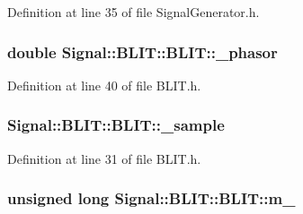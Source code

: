 Definition at line 35 of file Signal\+Generator.\+h.

\hypertarget{classSignal_1_1BLIT_1_1BLIT_ae1ed1e1125cef25e6a0dfb8de3c296da}{
\subsubsection[{\+\_\+phasor}]{\setlength{\rightskip}{0pt plus 5cm}double Signal\+::\+B\+L\+I\+T\+::\+B\+L\+I\+T\+::\+\_\+phasor\hspace{0.3cm}{\ttfamily [protected]}}}\label{classSignal_1_1BLIT_1_1BLIT_ae1ed1e1125cef25e6a0dfb8de3c296da}


Definition at line 40 of file B\+L\+I\+T.\+h.

\hypertarget{classSignal_1_1BLIT_1_1BLIT_ae3db6ee922897295fdf93a3b3c3dfadd}{
\subsubsection[{\+\_\+sample}]{ Signal\+::\+B\+L\+I\+T\+::\+B\+L\+I\+T\+::\+\_\+sample\hspace{0.3cm}{\ttfamily [protected]}}}\label{classSignal_1_1BLIT_1_1BLIT_ae3db6ee922897295fdf93a3b3c3dfadd}


Definition at line 31 of file B\+L\+I\+T.\+h.

\hypertarget{classSignal_1_1BLIT_1_1BLIT_a314aae37a0a53fa3f79a4466b9558fa5}{
\subsubsection[{m\+\_\+}]{\setlength{\rightskip}{0pt plus 5cm}unsigned long Signal\+::\+B\+L\+I\+T\+::\+B\+L\+I\+T\+::m\+\_\+\hspace{0.3cm}{\ttfamily [protected]}}}\label{classSignal_1_1BLIT_1_1BLIT_a314aae37a0a53fa3f79a4466b9558fa5}


